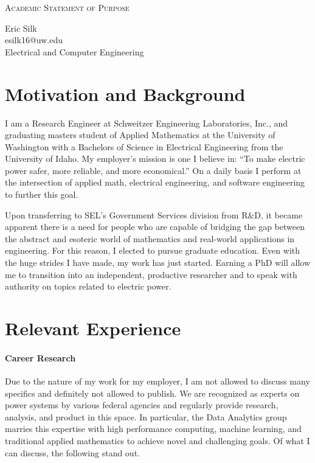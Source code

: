 \documentclass[letterpaper]{article}
\makeatletter
\newcommand{\soptitle}{Academic Statement of Purpose}
\newcommand{\yourname}{Eric Silk}
\newcommand{\youremail}{esilk16@uw.edu}
\makeatother
\begin{document}
\begin{center}{\huge \scshape \soptitle}\end{center}
\begin{center}\vspace{0.2em} {\Large \yourname\\}
  {\youremail\\}{Electrical and Computer Engineering}\end{center}
\frenchspacing



\section*{Motivation and Background}
I am a Research Engineer at Schweitzer Engineering Laboratories, Inc., and graduating masters
student of Applied Mathematics at the University of Washington with a Bachelors of Science
in Electrical Engineering from the University of Idaho. My employer's mission is
one I believe in: ``To make electric power safer, more reliable, and more economical.'' On a daily
basis I perform at the intersection of applied math, electrical engineering, and software
engineering to further this goal.

Upon transferring to SEL's Government Services division from R\&D, it became apparent
there is a need for people who are capable of bridging the gap between the abstract
and esoteric world of mathematics and real-world applications in engineering.
For this reason, I elected to pursue graduate education.
Even with the huge strides I have made, my work has just started. Earning a PhD will allow me to
transition into an independent, productive researcher and to speak with authority on topics
related to electric power.

\section*{Relevant Experience}
\paragraph{Career Research}
Due to the nature of my work for my employer, I am not allowed to discuss many specifics
and definitely not allowed to publish. We are recognized as experts
on power systems by various federal agencies and regularly provide research, analysis,
and product in this space. In particular, the Data Analytics group marries this expertise
with high performance computing, machine learning, and traditional applied mathematics to
achieve novel and challenging goals. Of what I can discuss, the following stand out.
\end{document}

